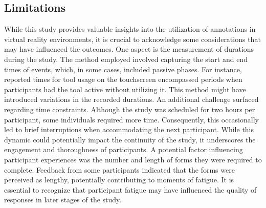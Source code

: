 \subsection{Limitations}

While this study provides valuable insights into the utilization of annotations in virtual reality environments, it is crucial to acknowledge some considerations that may have influenced the outcomes.
%
One aspect is the measurement of durations during the study. The method employed involved capturing the start and end times of events, which, in some cases, included passive phases. For instance, reported times for tool usage on the touchscreen encompassed periods when participants had the tool active without utilizing it. This method might have introduced variations in the recorded durations. 
%
An additional challenge surfaced regarding time constraints. Although the study was scheduled for two hours per participant, some individuals required more time. Consequently, this occasionally led to brief interruptions when accommodating the next participant. While this dynamic could potentially impact the continuity of the study, it underscores the engagement and thoroughness of participants.
%
A potential factor influencing participant experiences was the number and length of forms they were required to complete. Feedback from some participants indicated that the forms were perceived as lengthy, potentially contributing to moments of fatigue. It is essential to recognize that participant fatigue may have influenced the quality of responses in later stages of the study.